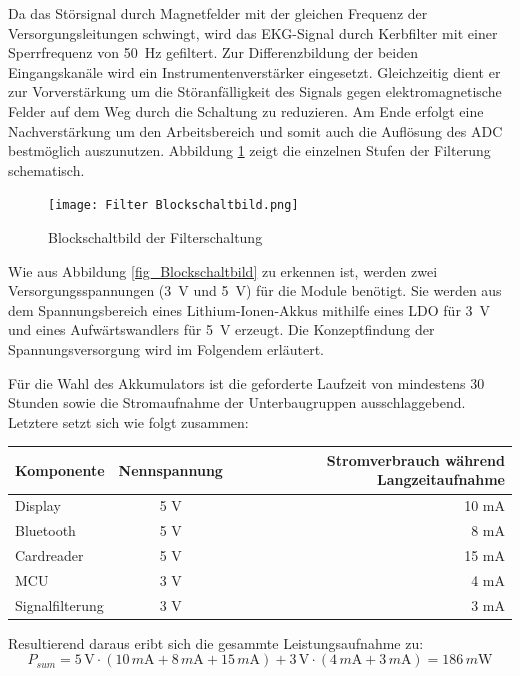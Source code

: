 Da das Störsignal durch Magnetfelder mit der gleichen Frequenz der Versorgungsleitungen schwingt, wird das EKG-Signal durch Kerbfilter mit einer Sperrfrequenz von \SI{50}{\hertz} gefiltert. Zur Differenzbildung der beiden Eingangskanäle wird ein Instrumentenverstärker eingesetzt. Gleichzeitig dient er zur Vorverstärkung um die Störanfälligkeit des Signals gegen elektromagnetische Felder auf dem Weg durch die Schaltung zu reduzieren. Am Ende erfolgt eine Nachverstärkung um den Arbeitsbereich und somit auch die Auflösung des ADC bestmöglich auszunutzen. Abbildung \ref{fig_Blockschaltbild Filter} zeigt die einzelnen Stufen der Filterung schematisch.

\begin{figure} [!h]
	\texttt{[image: Filter Blockschaltbild.png]}
	\caption{Blockschaltbild der Filterschaltung}
	\label{fig_Blockschaltbild Filter} 
\end{figure}

Wie aus Abbildung \ref{fig_Blockschaltbild} zu erkennen ist, werden zwei Versorgungsspannungen (\SI{3}{\volt}  und \SI{5}{\volt}) für die Module benötigt. Sie werden aus dem Spannungsbereich eines Lithium-Ionen-Akkus mithilfe eines LDO für \SI{3}{\volt} und eines Aufwärtswandlers für \SI{5}{\volt} erzeugt. Die Konzeptfindung der Spannungsversorgung wird im Folgendem erläutert.

Für die Wahl des Akkumulators ist die geforderte Laufzeit von mindestens 30 Stunden sowie die Stromaufnahme der Unterbaugruppen ausschlaggebend. Letztere setzt sich wie folgt zusammen:
\begin{table}[h]
\center
\begin{tabular}[h]{l|c|r}
Komponente & Nennspannung & Stromverbrauch während Langzeitaufnahme\\
\hline
Display & 5 V & 10 mA \cite{Datenblatt_Nextion}\\
Bluetooth & 5 V & 8 mA \cite{HC-05_Datasheet}\\
Cardreader & 5 V & 15 mA \cite{SD_Karte}\\
MCU & 3 V & 4 mA \cite{Datenblatt_MSP430F5529}\\
Signalfilterung & 3 V & 3 mA \\
\end{tabular}
\end{table}

Resultierend daraus eribt sich die gesammte Leistungsaufnahme zu: 
\[ P_{sum} = 5\,\mbox{V} \cdot (10\,m \mbox{A} + 8\,m\mbox{A} + 15\,m\mbox{A}) + 3\,\mbox{V} \cdot (4\, m\mbox{A} + 3 \,m\mbox{A}) = 186\, m\mbox{W} \]

